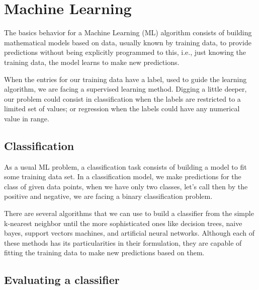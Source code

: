 \section{Machine Learning}
	
	The basics behavior for a Machine Learning (ML) algorithm consists of building mathematical models based on data, usually known by training data, to provide predictions without being explicitly programmed to this, i.e., just knowing the training data, the model learns to make new predictions. 
	
	When the entries for our training data have a label, used to guide the learning algorithm, we are facing a supervised learning method. Digging a little deeper, our problem could consist in classification when the labels are restricted to a limited set of values; or regression when the labels could have any numerical value in range. 
		
	\subsection{Classification}
	
	As a usual ML problem, a classification task consists of building a model to fit some training data set. In a classification model, we make predictions for the class of given data points, when we have only two classes, let's call then by the positive and negative, we are facing a binary classification problem.
	
	There are several algorithms that we can use to build a classifier from the simple k-nearest neighbor until the more sophisticated ones like decision trees, naive bayes, support vectors machines, and artificial neural networks. Although each of these methods has its particularities in their formulation, they are capable of fitting the training data to make new predictions based on them.
	
	
		
	\subsection{Evaluating a classifier}
	
